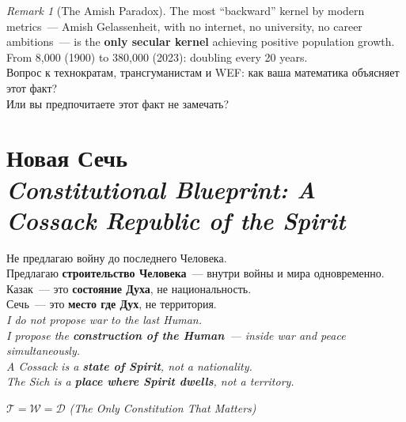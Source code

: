 \documentclass[11pt,a4paper]{article}
\theoremstyle{definition}
\theoremstyle{remark}
\newtheorem{remark}{Remark}
\newcommand{\Thought}{\mathcal{T}}
\newcommand{\Word}{\mathcal{W}}
\newcommand{\Deed}{\mathcal{D}}
\begin{document}
\begin{remark}[The Amish Paradox]
The most ``backward'' kernel by modern metrics~---
Amish Gelassenheit, with no internet, no university,
no career ambitions~--- is the \textbf{only secular kernel}
achieving positive population growth.
From 8{,}000 (1900) to 380{,}000 (2023):
doubling every 20 years.\\[0.2cm]
\foreignlanguage{russian}{
Вопрос к технократам, трансгуманистам и WEF:
как ваша математика объясняет этот факт?\\
Или вы предпочитаете этот факт не замечать?
}
\end{remark}

\newpage




\section{%
  \foreignlanguage{russian}{Новая Сечь}\\
  \normalsize\textit{Constitutional Blueprint:
  A Cossack Republic of the Spirit}}
\label{sec:sich}

\begin{sichbox}
\foreignlanguage{russian}{
Не предлагаю войну до последнего Человека.\\
Предлагаю \textbf{строительство Человека}~---
внутри войны и мира одновременно.\\[0.2cm]
Казак~--- это \textbf{состояние Духа}, не национальность.\\
Сечь~--- это \textbf{место где Дух}, не территория.
}\\[0.2cm]
\textit{I do not propose war to the last Human.\\
I propose the \textbf{construction of the Human}~---
inside war and peace simultaneously.\\[0.2cm]
A Cossack is a \textbf{state of Spirit}, not a nationality.\\
The Sich is a \textbf{place where Spirit dwells}, not a territory.}\\[0.2cm]
\begin{center}
{\color{goldcolor}
$\Thought = \Word = \Deed$
\quad\textit{(The Only Constitution That Matters)}}
\end{center}
\end{sichbox}
\end{document}
